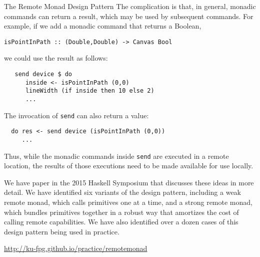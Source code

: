\begin{hcarentry}{The Remote Monad Design Pattern}
The complication is that, in general, monadic commands can return a
result, which may be used by subsequent commands.  For example, if we
add a monadic command that returns a Boolean,

\begin{verbatim}
isPointInPath :: (Double,Double) -> Canvas Bool
\end{verbatim}

we could use the result as follows:

\begin{verbatim}
   send device $ do
      inside <- isPointInPath (0,0)
      lineWidth (if inside then 10 else 2)
      ...
\end{verbatim}

The invocation of \verb`send` can also return a value:

\begin{verbatim}
  do res <- send device (isPointInPath (0,0))
     ...
\end{verbatim}

Thus, while the monadic commands inside \verb`send` are executed in a
remote location, the results of those executions need to be made
available for use locally. 

We have paper in the 2015 Haskell Symposium that discusses these ideas in more detail.
We have identified six variants of the design pattern, including
a weak remote monad, which calls primitives one at a time, and
a strong remote monad, which bundles primitives together in a robust way that
amortizes the cost of calling remote capabilities.
We have also identified over a dozen cases of this design pattern being used in practice. 

\FurtherReading
\begin{compactitem}
\item
  \url{http://ku-fpg.github.io/practice/remotemonad}
\end{compactitem}
\end{hcarentry}
